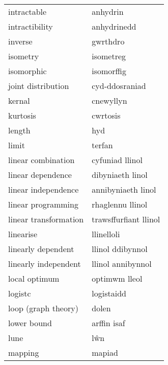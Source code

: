 \begin{supertabular}{p{0.22\textwidth}p{0.22\textwidth}}
                     intractable &                        anhydrin \\
                  intractibility &                     anhydrinedd \\
                         inverse &                        gwrthdro \\
                        isometry &                       isometreg \\
                      isomorphic &                      isomorffig \\
              joint distribution &                  cyd-ddosraniad \\
                          kernal &                       cnewyllyn \\
                        kurtosis &                        cwrtosis \\
                          length &                             hyd \\
                           limit &                          terfan \\
              linear combination &                 cyfuniad llinol \\
               linear dependence &                dibyniaeth linol \\
             linear independence &              annibyniaeth linol \\
              linear programming &                rhaglennu llinol \\
           linear transformation &           trawsffurfiant llinol \\
                       linearise &                      llinelloli \\
              linearly dependent &                llinol ddibynnol \\
            linearly independent &               llinol annibynnol \\
                   local optimum &                   optimwm lleol \\
                         logistc &                      logistaidd \\
             loop (graph theory) &                           dolen \\
                     lower bound &                     arffin isaf \\
                            lune &                             lŵn \\
                         mapping &                          mapiad \\

\end{supertabular}
